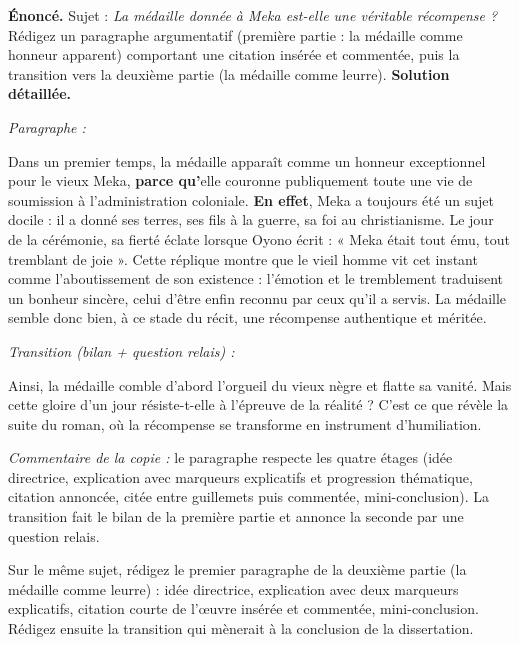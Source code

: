 \documentclass[11pt]{article}
\begin{document}
\begin{exoresolu}
\textbf{Énoncé.} Sujet : \emph{La médaille donnée à Meka est-elle une véritable récompense ?} Rédigez un paragraphe argumentatif (première partie : la médaille comme honneur apparent) comportant une citation insérée et commentée, puis la transition vers la deuxième partie (la médaille comme leurre).
\tcblower
\textbf{Solution détaillée.}

\emph{Paragraphe :}

Dans un premier temps, la médaille apparaît comme un honneur exceptionnel pour le vieux Meka, \textbf{parce qu'}elle couronne publiquement toute une vie de soumission à l'administration coloniale. \textbf{En effet}, Meka a toujours été un sujet docile : il a donné ses terres, ses fils à la guerre, sa foi au christianisme. Le jour de la cérémonie, sa fierté éclate lorsque Oyono écrit : « Meka était tout ému, tout tremblant de joie ». Cette réplique montre que le vieil homme vit cet instant comme l'aboutissement de son existence : l'émotion et le tremblement traduisent un bonheur sincère, celui d'être enfin reconnu par ceux qu'il a servis. La médaille semble donc bien, à ce stade du récit, une récompense authentique et méritée.

\emph{Transition (bilan + question relais) :}

Ainsi, la médaille comble d'abord l'orgueil du vieux nègre et flatte sa vanité. Mais cette gloire d'un jour résiste-t-elle à l'épreuve de la réalité ? C'est ce que révèle la suite du roman, où la récompense se transforme en instrument d'humiliation.

\emph{Commentaire de la copie :} le paragraphe respecte les quatre étages (idée directrice, explication avec marqueurs explicatifs et progression thématique, citation annoncée, citée entre guillemets puis commentée, mini-conclusion). La transition fait le bilan de la première partie et annonce la seconde par une question relais.
\end{exoresolu}

\begin{exercice}
Sur le même sujet, rédigez le premier paragraphe de la deuxième partie (la médaille comme leurre) : idée directrice, explication avec deux marqueurs explicatifs, citation courte de l'œuvre insérée et commentée, mini-conclusion. Rédigez ensuite la transition qui mènerait à la conclusion de la dissertation.
\end{exercice}
\end{document}
